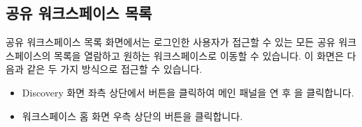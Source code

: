 \documentclass[letterpaper,10pt,english]{sphinxmanual}
\begin{document}
\subsection{공유 워크스페이스 목록}
\label{\detokenize{discovery/part03/shared_workspace:shared-workspace-list}}\label{\detokenize{discovery/part03/shared_workspace:id2}}
공유 워크스페이스 목록 화면에서는 로그인한 사용자가 접근할 수 있는 모든 공유 워크스페이스의 목록을 열람하고 원하는
워크스페이스로 이동할 수 있습니다. 이 화면은 다음과 같은 두 가지 방식으로 접근할 수 있습니다.
\begin{itemize}
\item {} 
Discovery 화면 좌측 상단에서  버튼을 클릭하여 메인 패널을 연 후 을 클릭합니다.

\item {} 
워크스페이스 홈 화면 우측 상단의  버튼을 클릭합니다.

\end{itemize}
\end{document}
